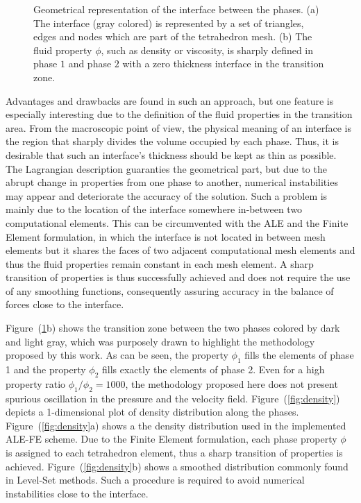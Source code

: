 \documentclass[a4paper,portuges]{article}
\begin{document}
\begin{figure}[ht!]
	\caption{Geometrical representation of the interface between the
	phases. (a) The interface (gray colored) is represented by a set of
	triangles, edges and nodes which are part of the tetrahedron mesh.
	(b) The fluid property $\phi$, such as density or viscosity, is
	sharply defined in phase $1$ and phase $2$ with a zero thickness
	interface in the transition zone.}
	\label{fig:inter} 
\end{figure}

Advantages and drawbacks are found in such an approach, but one feature
is especially interesting due to the definition of the fluid properties
in the transition area. From the macroscopic point of view, the physical
meaning of an interface is the region that sharply divides the volume
occupied by each phase. Thus, it is desirable that such an interface's
thickness should be kept as thin as possible. The Lagrangian description
guaranties the geometrical part, but due to the abrupt change in
properties from one phase to another, numerical instabilities may appear
and deteriorate the accuracy of the solution. Such a problem is mainly
due to the location of the interface somewhere in-between two
computational elements. This can be circumvented with the ALE and the
Finite Element formulation, in which the interface is not located in
between mesh elements but it shares the faces of two adjacent
computational mesh elements and thus the fluid properties remain
constant in each mesh element. A sharp transition of properties is thus
successfully achieved and does not require the use of any smoothing
functions, consequently assuring accuracy in the balance of forces close
to the interface. 

Figure~(\ref{fig:inter}b) shows the transition zone between the two
phases colored by dark and light gray, which was purposely drawn to
highlight the methodology proposed by this work. As can be seen, the
property $\phi_1$ fills the elements of phase 1 and the property
$\phi_2$ fills exactly the elements of phase 2. Even for a high property
ratio $\phi_1 / \phi_2 = 1000$, the methodology proposed here does not
present spurious oscillation in the pressure and the velocity field.
Figure~(\ref{fig:density}) depicts a 1-dimensional plot of density
distribution along the phases. Figure~(\ref{fig:density}a) shows a the
density distribution used in the implemented ALE-FE scheme. Due to the
Finite Element formulation, each phase property $\phi$ is assigned to
each tetrahedron element, thus a sharp transition of properties is
achieved. Figure~(\ref{fig:density}b) shows a smoothed distribution
commonly found in Level-Set methods. Such a procedure is required to
avoid numerical instabilities close to the interface.
\end{document}
